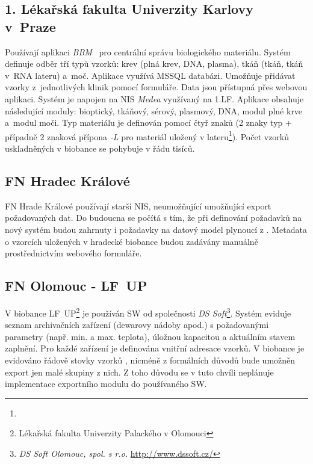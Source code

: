 \subsection{1. Lékařská fakulta Univerzity Karlovy v~Praze}
Používají aplikaci \textit{BBM}~\cite{1LF_BBM} pro centrální správu biologického materiálu. Systém definuje odběr tří typů vzorků: krev (plná krev, DNA, plasma), tkáň (tkáň, tkáň v~RNA lateru) a~moč. Aplikace využívá MSSQL databázi. Umožňuje přidávat vzorky z~jednotlivých klinik pomocí formuláře. Data jsou přístupná přes webovou aplikaci.
Systém je napojen na NIS \textit{Medea} využívaný na 1.LF. 
Aplikace obsahuje následující moduly:  bioptický, tkáňový, sérový, plasmový, DNA, modul plné krve a~modul moči.
Typ materiálu je definován pomocí čtyř znaků (2 znaky typ + případně 2 znaková přípona \textit{-L} pro materiál uložený v lateru\footnote{}).
Počet vzorků uskladněných v biobance se pohybuje v řádu tisíců.

\subsection{FN Hradec Králové}
FN Hrade Králové používají starší NIS, neumožňující umožňující export požadovaných dat. Do budoucna se počítá s tím, že při definování požadavků na nový systém budou zahrnuty i požadavky na datový model plynoucí z \ProjectName. Metadata o vzorcích uložených v hradecké biobance budou zadávány manuálně prostřednictvím webového formuláře.

\subsection{FN Olomouc - LF~UP}
V biobance LF~UP\footnote{Lékařská fakulta Univerzity Palackého v Olomouci} je používán SW od společnosti \textit{DS Soft}\footnote{\textit{DS Soft Olomouc, spol. s r.o.} \url{http://www.dssoft.cz/}}. Systém eviduje seznam archivačních zařízení (dewarovy nádoby apod.) s požadovanými parametry (např. min. a max. teplota), úložnou kapacitou a aktuálním stavem zaplnění. Pro každé zařízení je definována vnitřní adresace vzorků.
V biobance je evidováno řádově stovky vzorků , nicméně z formálních důvodů bude umožněn export jen malé skupiny z nich. Z toho důvodu se v tuto chvíli neplánuje implementace exportního modulu do používaného SW.


